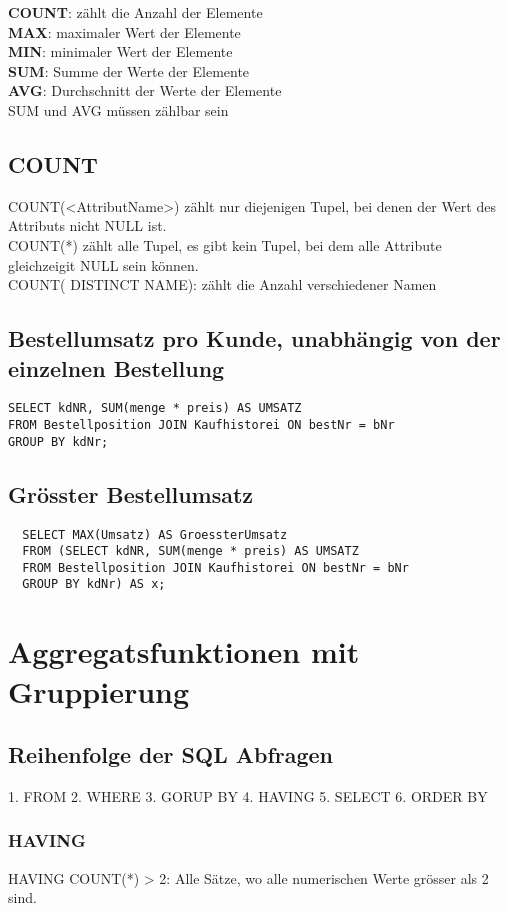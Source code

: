 \documentclass{article}
\begin{document}
\textbf{COUNT}: z\"ahlt die Anzahl der Elemente \\
\textbf{MAX}: maximaler Wert der Elemente \\
\textbf{MIN}: minimaler Wert der Elemente \\
\textbf{SUM}: Summe der Werte der Elemente \\
\textbf{AVG}: Durchschnitt der Werte der Elemente \\

SUM und AVG m\"ussen z\"ahlbar sein

\subsection{COUNT}

COUNT(<AttributName>) zählt nur diejenigen Tupel, bei denen der Wert des Attributs nicht NULL ist. \\
COUNT(*) zählt alle Tupel, es gibt kein Tupel, bei dem alle Attribute gleichzeigit NULL sein k\"onnen. \\
COUNT(\color{blue} DISTINCT \color{black}NAME): zählt die Anzahl verschiedener Namen

\subsection{Bestellumsatz pro Kunde, unabhängig von der einzelnen Bestellung}

\begin{verbatim}
SELECT kdNR, SUM(menge * preis) AS UMSATZ
FROM Bestellposition JOIN Kaufhistorei ON bestNr = bNr
GROUP BY kdNr;
\end{verbatim}

\subsection{Grösster Bestellumsatz}

\begin{verbatim}
  SELECT MAX(Umsatz) AS GroessterUmsatz
  FROM (SELECT kdNR, SUM(menge * preis) AS UMSATZ
  FROM Bestellposition JOIN Kaufhistorei ON bestNr = bNr
  GROUP BY kdNr) AS x;
  \end{verbatim}


\section{Aggregatsfunktionen mit Gruppierung}

\subsection{Reihenfolge der SQL Abfragen}
1. FROM
2. WHERE
3. GORUP BY
4. HAVING
5. SELECT
6. ORDER BY


\subsubsection{HAVING}
HAVING COUNT(*) > 2: Alle Sätze, wo alle numerischen Werte grösser als 2 sind.
\end{document}
